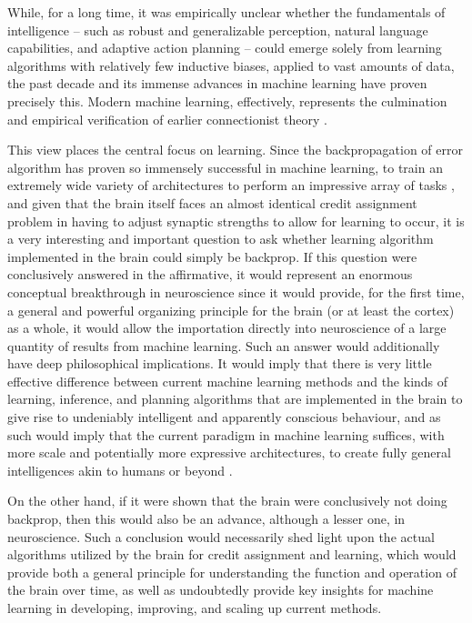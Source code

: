 While, for a long time, it was empirically unclear whether the fundamentals of intelligence -- such as robust and generalizable perception, natural language capabilities, and adaptive action planning -- could emerge solely from learning algorithms with relatively few inductive biases, applied to vast amounts of data, the past decade and its immense advances in machine learning have proven precisely this. Modern machine learning, effectively, represents the culmination and empirical verification of earlier connectionist theory \citep{rumelhart1986learning}.

This view places the central focus on learning. Since the backpropagation of error algorithm has proven so immensely successful in machine learning, to train an extremely wide variety of architectures to perform an impressive array of tasks \citep{krizhevsky2012imagenet,goodfellow2014generative,radford2019language,schrittwieser2019mastering,schmidhuber1999artificial}, and given that the brain itself faces an almost identical credit assignment problem in having to adjust synaptic strengths to allow for learning to occur, it is a very interesting and important question to ask whether learning algorithm implemented in the brain could simply be backprop. If this question were conclusively answered in the affirmative, it would represent an enormous conceptual breakthrough in neuroscience since it would provide, for the first time, a general and powerful organizing principle for the brain (or at least the cortex) as a whole, it would allow the importation directly into neuroscience of a large quantity of results from machine learning. Such an answer would additionally have deep philosophical implications. It would imply that there is very little effective difference between current machine learning methods and the kinds of learning, inference, and planning algorithms that are implemented in the brain to give rise to undeniably intelligent and apparently conscious behaviour, and as such would imply that the current paradigm in machine learning suffices, with more scale and potentially more expressive architectures, to create fully general intelligences akin to humans or beyond \citep{bostrom2017superintelligence}.

On the other hand, if it were shown that the brain were conclusively not doing backprop, then this would also be an advance, although a lesser one, in neuroscience. Such a conclusion would necessarily shed light upon the actual algorithms utilized by the brain for credit assignment and learning, which would provide both a general principle for understanding the function and operation of the brain over time, as well as undoubtedly provide key insights for machine learning in developing, improving, and scaling up current methods. 

